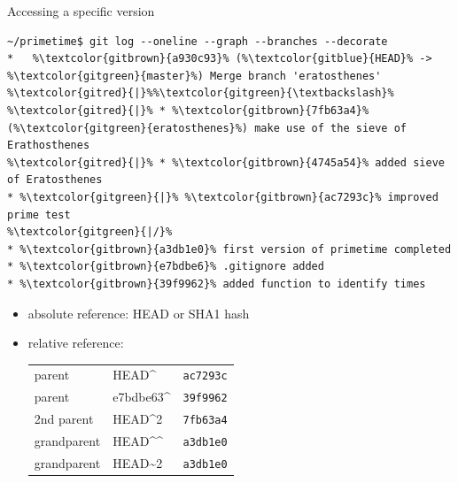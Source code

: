 \documentclass[svgnames]{beamer}
\begin{document}
\begin{frame}[fragile]{Accessing a specific version}
 \begin{lstlisting}[escapechar=\%]
~/primetime$ git log --oneline --graph --branches --decorate
*   %\textcolor{gitbrown}{a930c93}% (%\textcolor{gitblue}{HEAD}% -> %\textcolor{gitgreen}{master}%) Merge branch 'eratosthenes'
%\textcolor{gitred}{|}%%\textcolor{gitgreen}{\textbackslash}%
%\textcolor{gitred}{|}% * %\textcolor{gitbrown}{7fb63a4}% (%\textcolor{gitgreen}{eratosthenes}%) make use of the sieve of Erathosthenes
%\textcolor{gitred}{|}% * %\textcolor{gitbrown}{4745a54}% added sieve of Eratosthenes
* %\textcolor{gitgreen}{|}% %\textcolor{gitbrown}{ac7293c}% improved prime test
%\textcolor{gitgreen}{|/}%
* %\textcolor{gitbrown}{a3db1e0}% first version of primetime completed
* %\textcolor{gitbrown}{e7bdbe6}% .gitignore added
* %\textcolor{gitbrown}{39f9962}% added function to identify times
 \end{lstlisting}
 \begin{itemize}
  \item absolute reference: HEAD or SHA1 hash
  \item relative reference:\\[0.1truecm]
        \begin{tabular}{lll}
         parent & HEAD\textasciicircum & \texttt{ac7293c}\\
         parent & e7bdbe63\textasciicircum & \texttt{39f9962}\\
         2nd parent & HEAD\textasciicircum2 & \texttt{7fb63a4}\\
         grandparent & HEAD\textasciicircum\textasciicircum & \texttt{a3db1e0}\\
         grandparent & HEAD\textasciitilde2 & \texttt{a3db1e0}\\
        \end{tabular}
 \end{itemize}
\end{frame}
\end{document}
